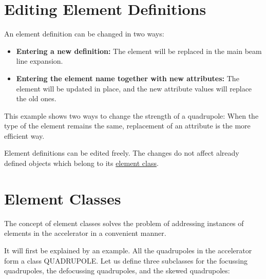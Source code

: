 %
\section{Editing Element Definitions}  
\label{sec:element-editing}

An element definition can be changed in two ways: 
\begin{itemize}
   \item \textbf{Entering a new definition:} The element will be
     replaced in the main beam line expansion.  
   \item \textbf{Entering the element name together with new
     attributes:} The element will be updated in place, and the new
     attribute values will replace the old ones.  
\end{itemize} 

This example shows two ways to change the strength of a quadrupole: 
When the type of the element remains the same, replacement of an
attribute is the more efficient way.  

Element definitions can be edited freely. The changes do not affect
already defined objects which belong to its
\href{elm_class.html}{element class}.  



%
\section{Element Classes}  
\label{sec:element-classes}
The concept of element classes solves the problem of addressing
instances of elements in the accelerator in a convenient manner. 

It will first be explained by an example. All the quadrupoles in the
accelerator form a class QUADRUPOLE. Let us define three subclasses for the
focussing quadrupoles, the defocussing quadrupoles, and the skewed
quadrupoles:  

